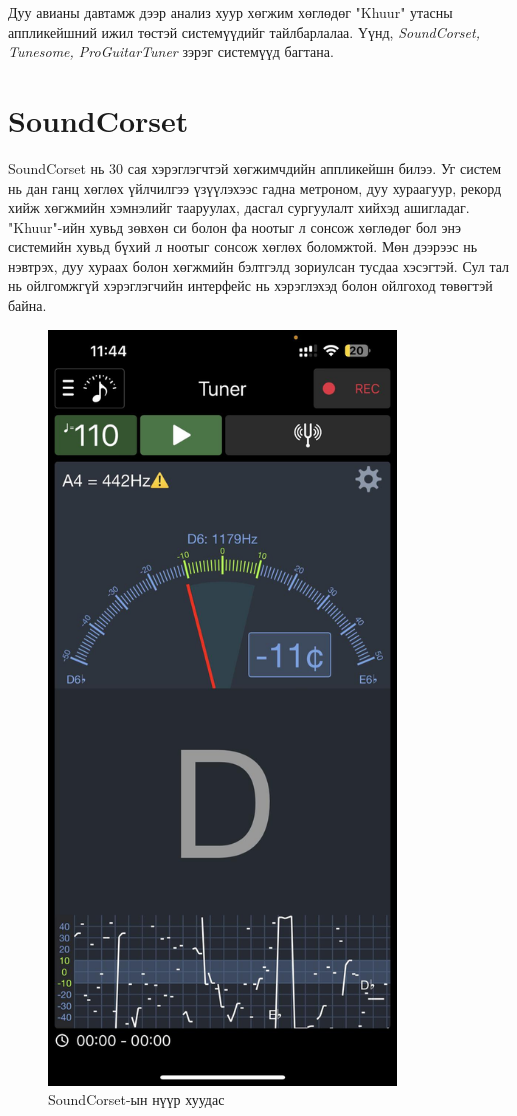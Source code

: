 Дуу авианы давтамж дээр анализ хуур хөгжим хөглөдөг "Khuur" утасны аппликейшний ижил төстэй системүүдийг тайлбарлалаа. Үүнд, \emph{SoundCorset, Tunesome, ProGuitarTuner} зэрэг системүүд багтана.

\section{SoundCorset}
SoundCorset нь 30 сая хэрэглэгчтэй хөгжимчдийн аппликейшн билээ. Уг систем нь дан ганц хөглөх үйлчилгээ үзүүлэхээс гадна метроном, дуу хураагуур, рекорд хийж хөгжмийн хэмнэлийг тааруулах, дасгал сургуулалт хийхэд ашигладаг. "Khuur"-ийн хувьд зөвхөн си болон фа ноотыг л сонсож хөглөдөг бол энэ системийн хувьд бүхий л ноотыг сонсож хөглөх боломжтой. Мөн дээрээс нь нэвтрэх, дуу хураах болон хөгжмийн бэлтгэлд зориулсан тусдаа хэсэгтэй. Сул тал нь ойлгомжгүй хэрэглэгчийн интерфейс нь хэрэглэхэд болон ойлгоход төвөгтэй байна.
\clearpage
\begin{figure}[h]
	\centering
	\includegraphics[height=20cm]{images/soundcorset2.jpg}
	\caption{SoundCorset-ын нүүр хуудас}
	\label{fig:modalform}
\end{figure}
